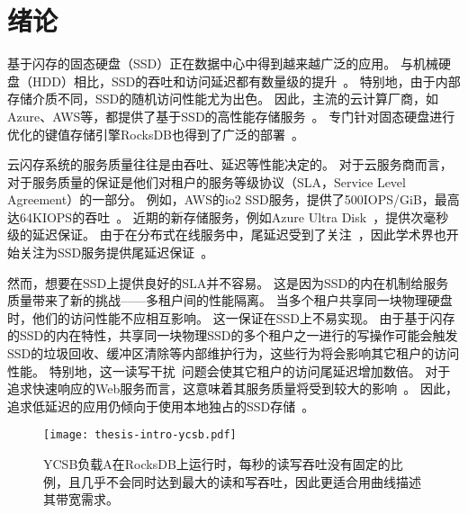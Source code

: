 
\chapter{绪论}
\label{chap:intro}

基于闪存的固态硬盘（SSD）正在数据中心中得到越来越广泛的应用。
与机械硬盘（HDD）相比，SSD的吞吐和访问延迟都有数量级的提升~\cite{chen2009understanding}。
特别地，由于内部存储介质不同，SSD的随机访问性能尤为出色。
因此，主流的云计算厂商，如Azure、AWS等，都提供了基于SSD的高性能存储服务~\cite{awsebs,azuredisks}。
专门针对固态硬盘进行优化的键值存储引擎RocksDB也得到了广泛的部署~\cite{cao2020characterizing,rocksdb,siying2021rocksdb}。

云闪存系统的服务质量往往是由吞吐、延迟等性能决定的。
对于云服务商而言，对于服务质量的保证是他们对租户的服务等级协议（SLA，Service Level Agreement）的一部分。
例如，AWS的io2 SSD服务，提供了500IOPS/GiB，最高达64KIOPS的吞吐~\cite{awsio2}。
近期的新存储服务，例如Azure Ultra Disk~\cite{azureultradisk}，提供次毫秒级的延迟保证。
由于在分布式在线服务中，尾延迟受到了关注~\cite{dean2013tail}，因此学术界也开始关注为SSD服务提供尾延迟保证~\cite{klimovic2017reflex}。


然而，想要在SSD上提供良好的SLA并不容易。
这是因为SSD的内在机制给服务质量带来了新的挑战——多租户间的性能隔离。
当多个租户共享同一块物理硬盘时，他们的访问性能不应相互影响。
这一保证在SSD上不易实现。
由于基于闪存的SSD的内在特性，共享同一块物理SSD的多个租户之一进行的写操作可能会触发SSD的垃圾回收、缓冲区清除等内部维护行为，这些行为将会影响其它租户的访问性能。
特别地，这一读写干扰~\cite{klimovic2017reflex}问题会使其它租户的访问尾延迟增加数倍。
对于追求快速响应的Web服务而言，这意味着其服务质量将受到较大的影响~\cite{dean2013tail}。
因此，追求低延迟的应用仍倾向于使用本地独占的SSD存储~\cite{awsvm,azurevm}。

\begin{figure}[h]
  \centering
  \texttt{[image: thesis-intro-ycsb.pdf]}
  \caption{
        YCSB负载A在RocksDB上运行时，每秒的读写吞吐没有固定的比例，且几乎不会同时达到最大的读和写吞吐，因此更适合用曲线描述其带宽需求。
      }
  \label{fig:intro}
\end{figure}

